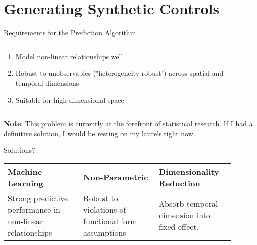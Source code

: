 \section{Generating Synthetic Controls}

\begin{frame}{Requirements for the Prediction Algorithm}
    \begin{columns}
    \begin{column}{0.5\linewidth}
    \vspace{5pt}
      \begin{enumerate}
         \item {Model non-linear relationships well}
         \item {Robust to unobservables ("heterogeneity-robust") across spatial and temporal dimensions}
         \item {Suitable for high-dimensional space}
      \end{enumerate}
    \end{column}
    \begin{column}{0.5\linewidth}
    \end{column}
  \end{columns}

    \begin{center}
    \vspace{5pt}
    \footnotesize{\textbf{Note}: This problem is currently at the forefront of statistical research. If I had a definitive solution, I would be resting on my laurels right now.}
    \end{center}
\end{frame}

\begin{frame}{Solutions?}

\begin{table}[htbp]
\centering
\begin{tabular}{|p{0.3\linewidth}|p{0.3\linewidth}|p{0.3\linewidth}|}
\hline
\textbf{Machine Learning} & \textbf{Non-Parametric} & \textbf{Dimensionality Reduction} \\
\hline
Strong predictive performance in non-linear relationships & Robust to violations of functional form assumptions & Absorb temporal dimension into fixed effect. \
\hline
\end{tabular}
\end{table}
\end{frame}


